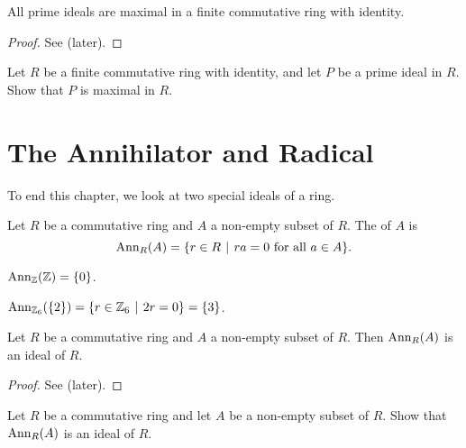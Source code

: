 \begin{corollary}\label{corollary-prime-ideal-is-maximal-in-finite-commutative-ring-with-identity}
    All prime ideals are maximal in a finite commutative ring with identity.
\end{corollary}
\begin{proof}
    See  (later).
\end{proof}
\begin{exercise}\label{exercise-prime-ideal-is-maximal-in-finite-commutative-ring-with-identity}
    Let $R$ be a finite commutative ring with identity, and let $P$ be a prime ideal in $R$. Show that $P$ is maximal in $R$.
\end{exercise}

\section{The Annihilator and Radical}
To end this chapter, we look at two special ideals of a ring.

\begin{definition}
    Let $R$ be a commutative ring and $A$ a non-empty subset of $R$. The  of $A$ is
    \[
        \Ann{R}{A} = \{r \in R \vert ra = 0 \text{ for all } a \in A\}.
    \]
\end{definition}

\begin{example}
    $\mathrm{Ann}_{\mathbb{Z}}(\mathbb{Z}) = \{0\}$.
\end{example}

\begin{example}
    $\Ann{\Z_6}{\{2\}} = \{r \in \Z_6 \vert 2r = 0\} = \{3\}$.
\end{example}

\begin{proposition}
    Let $R$ be a commutative ring and $A$ a non-empty subset of $R$. Then $\mathrm{Ann}_{R}(A)$ is an ideal of $R$.
\end{proposition}
\begin{proof}
    See  (later).
\end{proof}

\begin{exercise}\label{exercise-annihilator-is-an-ideal}
    Let $R$ be a commutative ring and let $A$ be a non-empty subset of $R$. Show that $\mathrm{Ann}_{R}(A)$ is an ideal of $R$.
\end{exercise}

